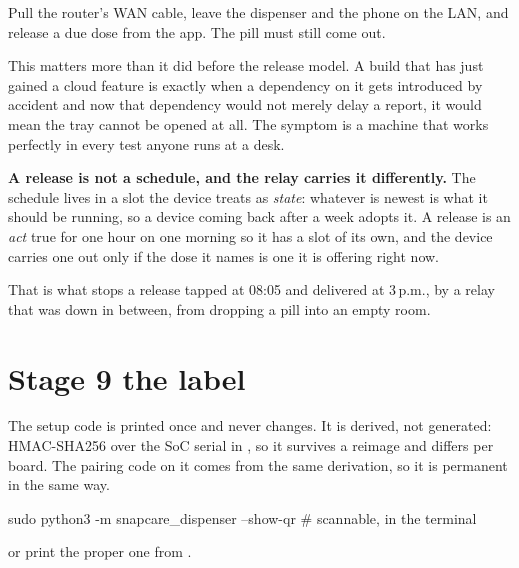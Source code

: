 \documentclass[11pt,a4paper]{article}
\begin{document}
\begin{dangerbox}
Pull the router's WAN cable, leave the dispenser and the phone on the LAN, and
release a due dose from the app. The pill must still come out.

\vspace{1ex}
This matters more than it did before the release model. A build that has just
gained a cloud feature is exactly when a dependency on it gets introduced by
accident \textemdash{} and now that dependency would not merely delay a report,
it would mean the tray cannot be opened at all. The symptom is a machine that
works perfectly in every test anyone runs at a desk.
\end{dangerbox}

\begin{notebox}
\textbf{\sffamily A release is not a schedule, and the relay carries it
differently.} The schedule lives in a slot the device treats as \emph{state}:
whatever is newest is what it should be running, so a device coming back after a
week adopts it. A release is an \emph{act} \textemdash{} true for one hour on one
morning \textemdash{} so it has a slot of its own, and the device carries one out
only if the dose it names is one it is offering right now.

\vspace{1ex}
That is what stops a release tapped at 08:05 and delivered at 3\,p.m., by a
relay that was down in between, from dropping a pill into an empty room.
\end{notebox}

\clearpage

\section{Stage 9 \textemdash{} the label}

The setup code is printed once and never changes. It is derived, not generated:
HMAC-SHA256 over the SoC serial in , so it survives a
reimage and differs per board. The pairing code on it comes from the same
derivation, so it is permanent in the same way.

\begin{shell}
sudo python3 -m snapcare_dispenser --show-qr      # scannable, in the terminal
\end{shell}

\noindent or print the proper one from .
\end{document}
